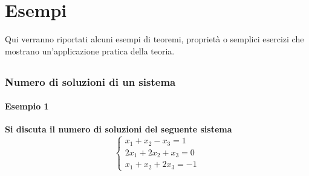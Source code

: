 
\section{Esempi}%
\label{sec:esempi}

Qui verranno riportati alcuni esempi di teoremi, proprietà o semplici esercizi che
mostrano un'applicazione pratica della teoria.

\subsection{}%

\subsection{}%

\subsubsection{Numero di soluzioni di un sistema}%
\label{ssub:numero_di_soluzioni_di_un_sistema}

\paragraph{Esempio 1}%
\label{par:esempio_1}

\textbf{Si discuta il numero di soluzioni del seguente sistema}
\begin{equation*}
  \begin{cases}
    x_1+x_2-x_3 = 1\\
    2x_1+2x_2+x_3=0\\
    x_1+x_2+2x_3=-1
  \end{cases}
\end{equation*}

